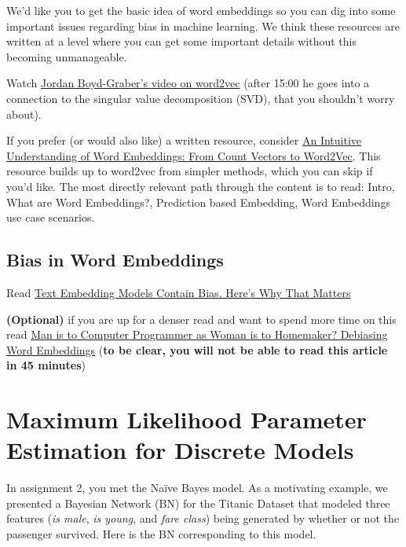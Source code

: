 \documentclass[assignment04_Solutions]{subfiles}
\begin{document}
\begin{externalresources}[(45 minutes)]
We'd like you to get the basic idea of word embeddings so you can dig into some important issues regarding bias in machine learning.  We think these resources are written at a level where you can get some important details without this becoming unmanageable.

\bi
\item Watch \href{https://www.youtube.com/watch?v=QyrUentbkvw}{Jordan Boyd-Graber's video on word2vec} (after 15:00 he goes into a connection to the singular value decomposition (SVD), that you shouldn't worry about).
\item If you prefer (or would also like) a written resource, consider \href{https://www.analyticsvidhya.com/blog/2017/06/word-embeddings-count-word2veec/}{An Intuitive Understanding of Word Embeddings: From Count Vectors to Word2Vec}.  This resource builds up to word2vec from simpler methods, which you can skip if you'd like.  The most directly relevant path through the content is to read: Intro,  What are Word Embeddings?, Prediction based Embedding, Word Embeddings use case scenarios.
\ei
\end{externalresources}

\subsection{Bias in Word Embeddings}

\begin{externalresources}[(45 minutes)]
\bi
\item Read \href{https://developers.googleblog.com/2018/04/text-embedding-models-contain-bias.html}{Text Embedding Models Contain Bias. Here's Why That Matters}
\item \textbf{(Optional)} if you are up for a denser read and want to spend more time on this read \href{https://papers.nips.cc/paper/6228-man-is-to-computer-programmer-as-woman-is-to-homemaker-debiasing-word-embeddings.pdf}{Man is to Computer Programmer as Woman is to Homemaker? Debiasing Word Embeddings} (\textbf{to be clear, you will not be able to read this article in 45 minutes})
\ei
\end{externalresources}

\section{Maximum Likelihood Parameter Estimation for Discrete Models}
In assignment 2, you met the Na\"ive Bayes model.  As a motivating example, we presented a Bayesian Network (BN) for the Titanic Dataset that modeled three features (\emph{is male}, \emph{is young}, and \emph{fare class}) being generated by whether or not the passenger survived.  Here is the BN corresponding to this model.
\end{document}

